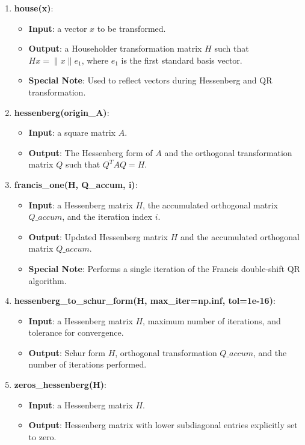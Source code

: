 \documentclass[12pt, a4paper]{ctexart}
\begin{document}
\begin{enumerate}
    \item \textbf{house(x)}:
    \begin{itemize}
        \item \textbf{Input}: a vector \(x\) to be transformed.
        \item \textbf{Output}: a Householder transformation matrix \(H\) such that \(Hx = \|x\|e_1\), where \(e_1\) is the first standard basis vector.
        \item \textbf{Special Note}: Used to reflect vectors during Hessenberg and QR transformation.
    \end{itemize}

    \item \textbf{hessenberg(origin\_A)}:
    \begin{itemize}
        \item \textbf{Input}: a square matrix \(A\).
        \item \textbf{Output}: The Hessenberg form of \(A\) and the orthogonal transformation matrix \(Q\) such that \(Q^T A Q = H\).
    \end{itemize}

    \item \textbf{francis\_one(H, Q\_accum, i)}:
    \begin{itemize}
        \item \textbf{Input}: a Hessenberg matrix \(H\), the accumulated orthogonal matrix \(Q\_accum\), and the iteration index \(i\).
        \item \textbf{Output}: Updated Hessenberg matrix \(H\) and the accumulated orthogonal matrix \(Q\_accum\).
        \item \textbf{Special Note}: Performs a single iteration of the Francis double-shift QR algorithm.
    \end{itemize}

    \item \textbf{hessenberg\_to\_schur\_form(H, max\_iter=np.inf, tol=1e-16)}:
    \begin{itemize}
        \item \textbf{Input}: a Hessenberg matrix \(H\), maximum number of iterations, and tolerance for convergence.
        \item \textbf{Output}: Schur form \(H\), orthogonal transformation \(Q\_accum\), and the number of iterations performed.
    \end{itemize}

    \item \textbf{zeros\_hessenberg(H)}:
    \begin{itemize}
        \item \textbf{Input}: a Hessenberg matrix \(H\).
        \item \textbf{Output}: Hessenberg matrix with lower subdiagonal entries explicitly set to zero.
    \end{itemize}


\end{enumerate}
\end{document}
